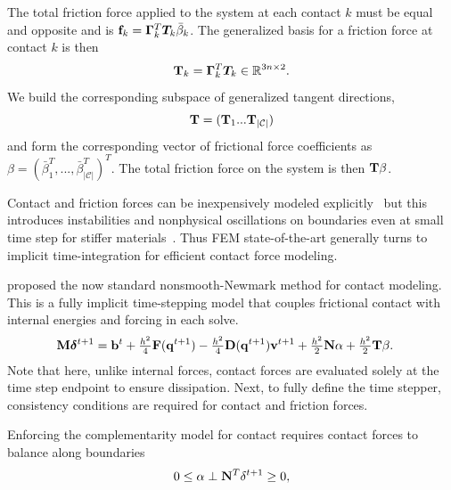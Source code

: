 The total friction force applied to the system at each contact $k$ must be equal and opposite and is $\mathbf {f}_k = \mathbf {\Gamma}_k^T \bm{T}_k \bar{\beta}_k$. 
The generalized basis for a friction force at contact $k$ is then 
\begin{equation}
\mathbf {T}_k = \mathbf {\Gamma}_k^T \bm{T}_k \in \mathbb{R}^{3n \times 2}.
\end{equation}
We build the corresponding subspace of generalized tangent directions,
\begin{equation}
\mathbf {T} = ( \mathbf {T}_1 ... \mathbf {T}_{|\mathcal C|})
\end{equation}
and form the corresponding vector of frictional force coefficients as $\beta = ( \bar{\beta}^T_1,  ... , \bar{\beta}^T_{|\mathcal C|})^T$.
The total friction force on the system is then $\mathbf {T} \beta$.

Contact and friction forces can be inexpensively modeled explicitly~\citep{Belytschko:2013tz} but this introduces instabilities and nonphysical oscillations on boundaries even at small time step for stiffer materials~\cite{Deuflhard:2008fu}. Thus FEM state-of-the-art generally turns to implicit time-integration for efficient contact force modeling. 

\citet{Kane:1999kr} proposed the now standard nonsmooth-Newmark method for contact modeling. 
This is a fully implicit time-stepping model that couples frictional contact with internal energies and forcing in each solve.
\begin{align}
\begin{split}
\mathbf {M} \bm{\delta}^{t+1} &= \mathbf {b}^t +  \tfrac{h^2}{4} \mathbf {F}(\mathbf {q}^{t+1}) -\tfrac{h^2}{4} \mathbf {D}(\mathbf {q}^{t+1}) \mathbf {v}^{t+1} + \tfrac{h^2}{2} \mathbf {N} \alpha +  \tfrac{h^2}{2}  \mathbf {T} \beta.
\label{eq:newmark_contact_implicit}
\end{split}
\end{align}
Note that here, unlike internal forces, contact forces are evaluated solely at the time step endpoint to ensure dissipation.
Next, to fully define the time stepper, consistency conditions are required for contact and friction forces. 

Enforcing the complementarity model for contact requires contact forces to balance along boundaries 
\begin{align}
\begin{split}
0 \leq \alpha \perp \mathbf {N}^T \delta^{t+1} \geq 0,
\label{eq:contact_conditions}
\end{split}
\end{align}

